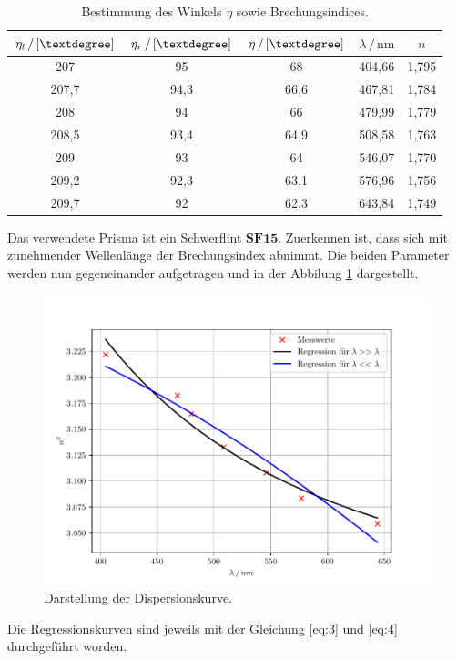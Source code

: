 \begin{table}[H]
  \centering
  \caption{Bestimmung des Winkels $\eta$ sowie Brechungsindices.}
  \label{tab:2}
  \begin{tabular}{c c c c c}
    \toprule
    $\eta_l\,/\,[\textdegree]$ & $\eta_r\,/\,[\textdegree]$ & $\eta \,/\,[\textdegree]$ &$\lambda \,/\,\si{\nano\meter}$ & $n$\\
    \midrule
    207 & 95 & 68 & 404,66 & 1,795\\
    207,7 & 94,3 & 66,6 & 467,81 & 1,784\\
    208 & 94 & 66 & 479,99 & 1,779\\
    208,5 & 93,4 & 64,9 & 508,58 & 1,763\\
    209 & 93 & 64 & 546,07 & 1,770\\
    209,2 & 92,3 & 63,1 & 576,96 & 1,756\\
    209,7 & 92 & 62,3 & 643,84 & 1,749\\
    \bottomrule
  \end{tabular}
\end{table}
Das verwendete Prisma ist ein Schwerflint $\textbf{SF15}$. Zuerkennen ist, dass
sich mit zunehmender Wellenlänge der Brechungsindex abnimmt.
Die beiden Parameter werden nun gegeneinander aufgetragen und in der Abbilung \ref{abb:4} dargestellt.
\begin{figure}[H]
  \centering
  \includegraphics[width=\textwidth]{plot1.pdf}
  \caption{Darstellung der Dispersionskurve.}
  \label{abb:4}
\end{figure}
Die Regressionskurven sind jeweils mit der Gleichung \ref{eq:3} und \ref{eq:4} durchgeführt worden.
